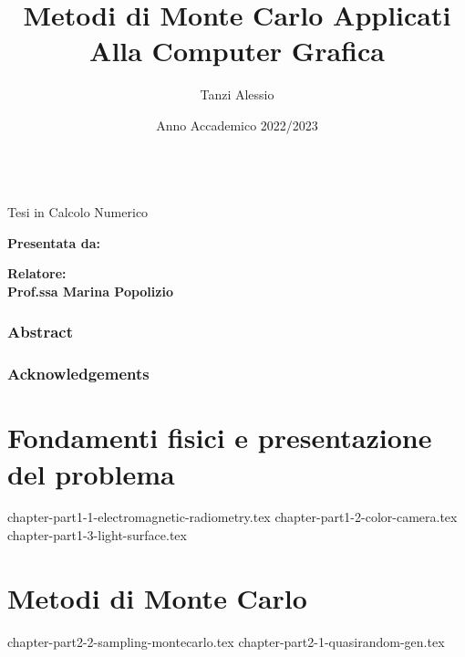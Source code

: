 \documentclass[12pt, openany]{book}
\title{Metodi di Monte Carlo Applicati Alla Computer Grafica}
\author{Tanzi Alessio}
\date{Anno Accademico 2022/2023}
\theoremstyle{theoremdd}
\newcommand{\professor}{Prof.ssa Marina Popolizio}
\begin{document}
	\begin{titlepage}
		\begin{center}
			\vspace*{1cm}
			{\Huge \bfseries \thetitle}\\ %
			\vspace*{1cm}
			{\Large Tesi in Calcolo Numerico}
		\end{center}
		\vspace*{1cm}
		\begin{flushright}
			{\Large\bfseries Presentata da:\\\theauthor}
		\end{flushright}
		\begin{flushleft}
			{\Large\bfseries Relatore:\\\professor} 
		\end{flushleft}
		\vspace*{1cm}
		\begin{center}
			{\Large\thedate}
		\end{center}
	\end{titlepage}

	\frontmatter
	\section*{Abstract}

	\section*{Acknowledgements}

	\tableofcontents

	\mainmatter
	\part{Fondamenti fisici e presentazione del problema}
	{chapter-part1-1-electromagnetic-radiometry.tex}
	{chapter-part1-2-color-camera.tex}
	{chapter-part1-3-light-surface.tex}

	\part{Metodi di Monte Carlo}
	{chapter-part2-2-sampling-montecarlo.tex}
	{chapter-part2-1-quasirandom-gen.tex}
\end{document}
